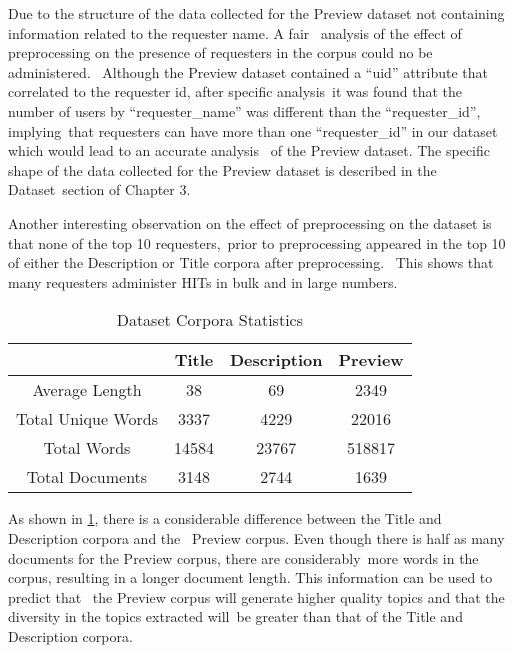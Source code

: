 \documentclass[letterpaper,12pt]{article}
\begin{document}

\newpage

Due to the structure of the data collected for the Preview dataset not containing information related to the requester name. A fair \
analysis of the effect of preprocessing on the presence of requesters in the corpus could no be administered. \
Although the Preview dataset contained a ``uid'' attribute that correlated to the requester id, after specific analysis\
it was found that the number of users by ``requester\_name'' was different than the ``requester\_id'', implying\
that requesters can have more than one ``requester\_id'' in our dataset which would lead to an accurate analysis \
of the Preview dataset. The specific shape of the data collected for the Preview dataset is described in the Dataset\
section of Chapter 3.

Another interesting observation on the effect of preprocessing on the dataset is that none of the top 10 requesters,\
prior to preprocessing appeared in the top 10 of either the Description or Title corpora after preprocessing. \
This shows that many requesters administer HITs in bulk and in large numbers.

\begin{table}
	\caption{\label{tab:corpora_comparison} Dataset Corpora Statistics}
	\begin{center}
		\begin{tabular}{|c|c|c|c|}
			\hline
			{} &  \textbf{Title} & \textbf{Description} & \textbf{Preview} \\
			\hline
			Average Length & 38 & 69 & 2349\\
			\hline
			Total Unique Words & 3337 & 4229 & 22016\\
			\hline
			Total Words & 14584 & 23767 & 518817\\
			\hline
			Total Documents & 3148 & 2744 & 1639 \\
			\hline
		\end{tabular}
	\end{center}
\end{table}

As shown in \ref{tab:corpora_comparison}, there is a considerable difference between the Title and Description corpora and the \
Preview corpus. Even though there is half as many documents for the Preview corpus, there are considerably\
more words in the corpus, resulting in a longer document length. This information can be used to predict that \
the Preview corpus will generate higher quality topics and that the diversity in the topics extracted will\
be greater than that of the Title and Description corpora.
\end{document}
